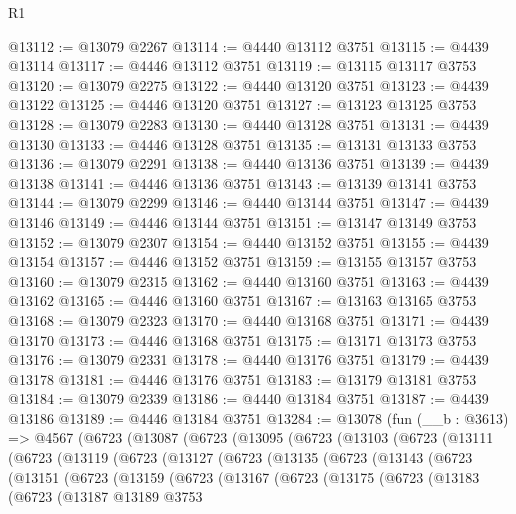 \begin{lexlean}{R1}
\begin{coremodule}
@13112 := @13079 @2267
@13114 := @4440 @13112 @3751
@13115 := @4439 @13114
@13117 := @4446 @13112 @3751
@13119 := @13115 @13117 @3753
@13120 := @13079 @2275
@13122 := @4440 @13120 @3751
@13123 := @4439 @13122
@13125 := @4446 @13120 @3751
@13127 := @13123 @13125 @3753
@13128 := @13079 @2283
@13130 := @4440 @13128 @3751
@13131 := @4439 @13130
@13133 := @4446 @13128 @3751
@13135 := @13131 @13133 @3753
@13136 := @13079 @2291
@13138 := @4440 @13136 @3751
@13139 := @4439 @13138
@13141 := @4446 @13136 @3751
@13143 := @13139 @13141 @3753
@13144 := @13079 @2299
@13146 := @4440 @13144 @3751
@13147 := @4439 @13146
@13149 := @4446 @13144 @3751
@13151 := @13147 @13149 @3753
@13152 := @13079 @2307
@13154 := @4440 @13152 @3751
@13155 := @4439 @13154
@13157 := @4446 @13152 @3751
@13159 := @13155 @13157 @3753
@13160 := @13079 @2315
@13162 := @4440 @13160 @3751
@13163 := @4439 @13162
@13165 := @4446 @13160 @3751
@13167 := @13163 @13165 @3753
@13168 := @13079 @2323
@13170 := @4440 @13168 @3751
@13171 := @4439 @13170
@13173 := @4446 @13168 @3751
@13175 := @13171 @13173 @3753
@13176 := @13079 @2331
@13178 := @4440 @13176 @3751
@13179 := @4439 @13178
@13181 := @4446 @13176 @3751
@13183 := @13179 @13181 @3753
@13184 := @13079 @2339
@13186 := @4440 @13184 @3751
@13187 := @4439 @13186
@13189 := @4446 @13184 @3751
@13284 := @13078
    (fun (__b : @3613) =>
    @4567
      (@6723
        (@13087
          (@6723
            (@13095
              (@6723
                (@13103
                  (@6723
                    (@13111
                      (@6723
                        (@13119
                          (@6723
                            (@13127
                              (@6723
                                (@13135
                                  (@6723
                                    (@13143
                                      (@6723
                                        (@13151
                                          (@6723
                                            (@13159
                                              (@6723
                                                (@13167
                                                  (@6723
                                                    (@13175
                                                      (@6723
                                                        (@13183
                                                          (@6723
                                                            (@13187
                                                              @13189
                                                              @3753

\end{coremodule}
\end{lexlean}
